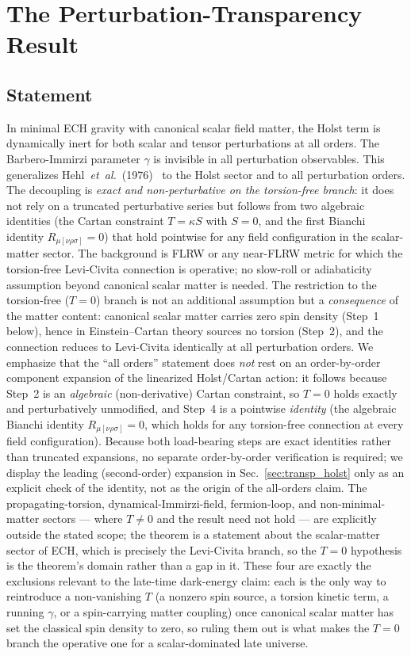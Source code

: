 \documentclass[aps,prd,twocolumn,superscriptaddress,showpacs,preprintnumbers,nofootinbib,longbibliography,floatfix]{revtex4-2}
\newcommand{\etal}{\textit{et~al.}}
\begin{document}
\section{The Perturbation-Transparency Result}\label{sec:transparency}

\subsection{Statement}

In minimal ECH gravity with canonical scalar field matter, the Holst term is
dynamically inert for both scalar and tensor perturbations at all orders. The
Barbero-Immirzi parameter $\gamma$ is invisible in all perturbation observables.
This generalizes Hehl~\etal~(1976)~\cite{Hehl1976} to the Holst sector and to
all perturbation orders. The decoupling is \emph{exact and non-perturbative on the
torsion-free branch}: it does not rely on a truncated perturbative series but
follows from two algebraic identities (the Cartan constraint $T=\kappa S$ with
$S=0$, and the first Bianchi identity $R_{\mu[\nu\rho\sigma]}=0$) that hold
pointwise for any field configuration in the scalar-matter sector. The background
is FLRW or any near-FLRW metric for which the torsion-free Levi-Civita connection
is operative; no slow-roll or adiabaticity assumption beyond canonical scalar
matter is needed. The restriction to the torsion-free ($T=0$) branch is
not an additional assumption but a \emph{consequence} of the matter content:
canonical scalar matter carries zero spin density (Step~1 below), hence in
Einstein--Cartan theory sources no torsion (Step~2), and the connection reduces
to Levi-Civita identically at all perturbation orders. We emphasize that the
``all orders'' statement does \emph{not} rest on an order-by-order component
expansion of the linearized Holst/Cartan action: it follows because Step~2 is
an \emph{algebraic} (non-derivative) Cartan constraint, so $T=0$ holds
exactly and perturbatively unmodified, and Step~4 is a pointwise
\emph{identity} (the algebraic Bianchi identity $R_{\mu[\nu\rho\sigma]}=0$,
which holds for any torsion-free connection at every field configuration).
Because both load-bearing steps are exact identities rather than truncated
expansions, no separate order-by-order verification is required; we display
the leading (second-order) expansion in Sec.~\ref{sec:transp_holst} only as an
explicit check of the identity, not as the origin of the all-orders claim. The propagating-torsion,
dynamical-Immirzi-field, fermion-loop, and non-minimal-matter sectors --- where
$T\neq0$ and the result need not hold --- are explicitly outside the stated
scope; the theorem is a statement about the scalar-matter sector of ECH, which
is precisely the Levi-Civita branch, so the $T=0$ hypothesis is the theorem's
domain rather than a gap in it. These four are exactly the exclusions relevant
to the late-time dark-energy claim: each is the only way to reintroduce a
non-vanishing $T$ (a nonzero spin source, a torsion kinetic term, a running
$\gamma$, or a spin-carrying matter coupling) once canonical scalar matter has
set the classical spin density to zero, so ruling them out is what makes the
$T=0$ branch the operative one for a scalar-dominated late universe.
\end{document}
